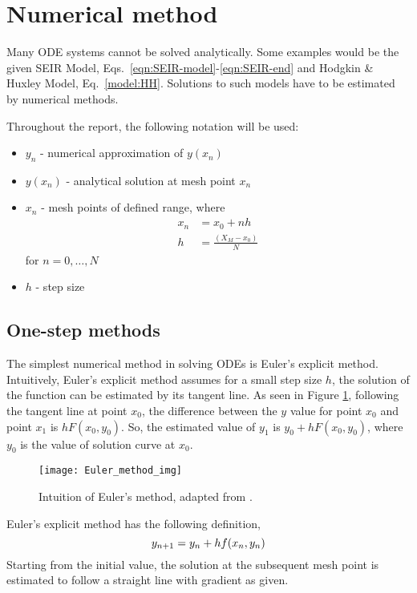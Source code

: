 \section{Numerical method}
Many ODE systems cannot be solved analytically. Some examples would be the given SEIR Model, Eqs.~\eqref{eqn:SEIR-model}-\eqref{eqn:SEIR-end} and Hodgkin \& Huxley Model, Eq.~\eqref{model:HH}. Solutions to such models have to be estimated by numerical methods.

Throughout the report, the following notation will be used:
\begin{itemize}
    \item $y_n$ - numerical approximation of $y(x_n)$
    \item $y(x_n)$ - analytical solution at mesh point $x_n$
    \item $x_n$ - mesh points of defined range, where
        \begin{align}
            x_n &= x_0 + nh\\
            h &= \frac{(X_M - x_0)}{N}
        \end{align}
        for $n = 0,\dots, N$
    \item $h$ - step size
\end{itemize}

\subsection{One-step methods}
\label{subsec:one-step-method}
The simplest numerical method in solving ODEs is Euler's explicit method. Intuitively, Euler's explicit method assumes for a small step size $h$, the solution of the function can be estimated by its tangent line. As seen in Figure \ref{fig:Euler_method}, following the tangent line at point $x_0$, the difference between the $y$ value for point $x_0$ and point $x_1$ is $hF(x_0,y_0)$. So, the estimated value of $y_1$ is $y_0 + hF(x_0,y_0)$, where $y_0$ is the value of solution curve at $x_0$.

\begin{figure}
\centering
    \texttt{[image: Euler\_method\_img]}
    \caption{Intuition of Euler's method, adapted from \cite{CalcWorkshop2019}.}
    \label{fig:Euler_method}
\end{figure}

Euler's explicit method has the following definition,  
\begin{equation}
    y_{n+1} = y_n + hf(x_n,y_n)\\
\end{equation}
Starting from the initial value, the solution at the subsequent mesh point is estimated to follow a straight line with gradient as given.

